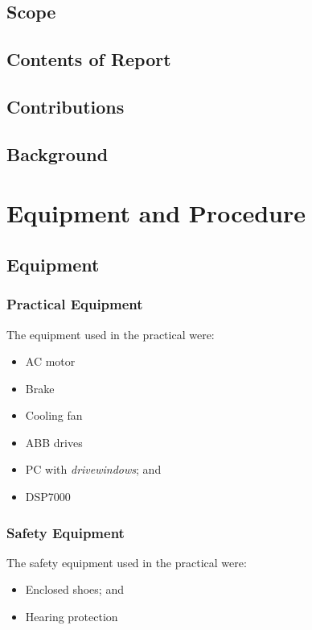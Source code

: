 \documentclass[12pt]{report}
\begin{document}
	\section{Scope} %
	
	\section{Contents of Report}
	
	\section{Contributions}
	
	\section{Background}
	
	\chapter{Equipment and Procedure}
	
	\section{Equipment}
	\subsection{Practical Equipment}
	The equipment used in the practical were:
	\begin{itemize}
		\item{AC motor}
		\item{Brake}
		\item{Cooling fan}
		\item{ABB drives}
		\item{PC with \textit{drivewindows}; and}
		\item{DSP7000}
	\end{itemize}
	\subsection{Safety Equipment}
	The safety equipment used in the practical were:
	\begin{itemize}
		\item{Enclosed shoes; and}
		\item{Hearing protection}
	\end{itemize}
	
\end{document}
